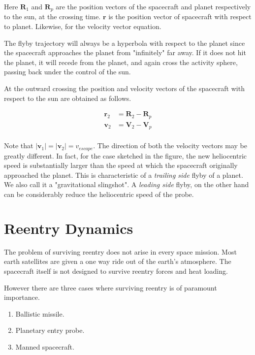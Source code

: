 \documentclass{article}
\theoremstyle{definition}
\begin{document}
Here $\boldsymbol{R}_1$ and $\boldsymbol{R}_p$ are the position vectors of the spacecraft and planet respectively to the sun, at the crossing time. 
$\boldsymbol{r}$ is the position vector of spacecraft with respect to planet. 
Likewise, for the velocity vector equation.

The flyby trajectory will always be a hyperbola with respect to the planet since the spacecraft approaches the planet from "infinitely" far away. 
If it does not hit the planet, it will recede from the planet, and again cross the activity sphere, passing back under the control of the sun.

At the outward crossing the position and velocity vectors of the spacecraft with respect to the sun are obtained as follows.

\begin{equation}
\begin{split}
    \boldsymbol{r}_2 & = \boldsymbol{R}_2 - \boldsymbol{R}_p\\
    \boldsymbol{v}_2 & = \boldsymbol{V}_2 - \boldsymbol{V}_p\\
\end{split}
\end{equation}

Note that $|\boldsymbol{v}_1|=|\boldsymbol{v}_2|=v_{escape}$.
The direction of both the velocity vectors may be greatly different.
In fact, for the case sketched in the figure, the new heliocentric speed is substantially larger than the speed at which the spacecraft originally approached the planet. 
This is characteristic of a \emph{trailing side} flyby of a planet.
We also call it a "gravitational slingshot".
A \emph{leading side} flyby, on the other hand can be considerably reduce the heliocentric speed of the probe.





\section{Reentry Dynamics}

The problem of surviving reentry does not arise in every space mission. 
Most earth satellites are given a one way ride out of the earth's atmosphere.
The spacecraft itself is not designed to survive reentry forces and heat loading.

However there are three cases where surviving reentry is of paramount importance. 
\begin{enumerate}
    \item Ballistic missile.
    \item Planetary entry probe.
    \item Manned spacecraft.
\end{enumerate}
\end{document}

